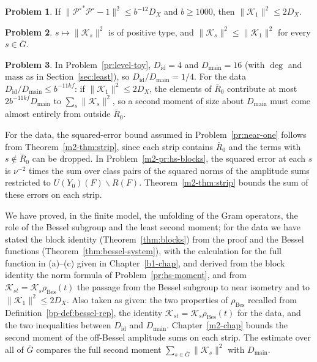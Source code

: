 \documentclass[reqno]{amsart}
\newcounter{chap}
\theoremstyle{definition}
\newtheorem{problem}{Problem}[section]
\theoremstyle{plain}
\theoremstyle{remark}
\newcommand{\Gb}{\bar G}
\newcommand{\Rb}{\bar R_0}
\newcommand{\Kc}{\mathcal K}
\newcommand{\Po}{{\mathcal P^\circ}}
\newcommand{\rB}{\rho_{\mathrm{Bes}}}
\newcommand{\Did}{D_{\mathrm{id}}}
\newcommand{\Dmain}{D_{\mathrm{main}}}
\begin{document}
\begin{problem}\label{pr:P-one}
If \(\lVert\Po^*\Po-1\rVert^2\le b^{-12}D_X\) and \(b\ge1000\), then \(\lVert\Kc_1\rVert^2\le2D_X\).
\end{problem}

\begin{problem}\label{pr:positive-type}
\(s\mapsto\lVert\Kc_s\rVert^2\) is of positive type, and \(\lVert\Kc_s\rVert^2\le\lVert\Kc_1\rVert^2\) for every \(s\in\Gb\).
\end{problem}

\begin{problem}\label{pr:sizes-toy}
In Problem~\ref{pr:level-toy}, \(\Did=4\) and \(\Dmain=16\) (with \(\deg\) and \(\mathrm{mass}\) as in Section~\ref{sec:least}), so \(\Did/\Dmain=1/4\).  For the data \(\Did/\Dmain\le b^{-11kf}\): if \(\lVert\Kc_1\rVert^2\le2D_X\), the elements of \(\Rb\) contribute at most \(2b^{-11kf}\Dmain\) to \(\sum_s\lVert\Kc_s\rVert^2\), so a second moment of size about \(\Dmain\) must come almost entirely from outside \(\Rb\).
\end{problem}

For the data, the squared-error bound assumed in Problem~\ref{pr:near-one} follows from Theorem~\ref{m2-thm:strip}, since each strip contains \(\Rb\) and the terms with \(s\notin\Rb\) can be dropped.  In Problem~\ref{m2-pr:hs-blocks}, the squared error at each \(s\) is \(\nu^{-2}\) times the sum over class pairs of the squared norms of the amplitude sums restricted to \(U(Y_0)(F)\smallsetminus R(F)\).  Theorem~\ref{m2-thm:strip} bounds the sum of these errors on each strip.

We have proved, in the finite model, the unfolding of the Gram operators, the role of the Bessel subgroup and the least second moment; for the data we have stated the block identity (Theorem~\ref{thm:blocks}) from the proof and the Bessel functions (Theorem~\ref{thm:bessel-system}), with the calculation for the full function in (a)--(c) given in Chapter~\ref{b1-chap}, and derived from the block identity the norm formula of Problem~\ref{pr:hs-moment}, and from \(\Kc_{st}=\Kc_s\rB(t)\) the passage from the Bessel subgroup to near isometry and to \(\lVert\Kc_1\rVert^2\le2D_X\).  Also taken as given: the two properties of \(\rB\) recalled from Definition~\ref{bp-def:bessel-rep}, the identity \(\Kc_{st}=\Kc_s\rB(t)\) for the data, and the two inequalities between \(\Did\) and \(\Dmain\).  Chapter~\ref{m2-chap} bounds the second moment of the off-Bessel amplitude sums on each strip.  The estimate over all of \(\Gb\) compares the full second moment \(\sum_{s\in\Gb}\lVert\Kc_s\rVert^2\) with \(\Dmain\).
\end{document}
